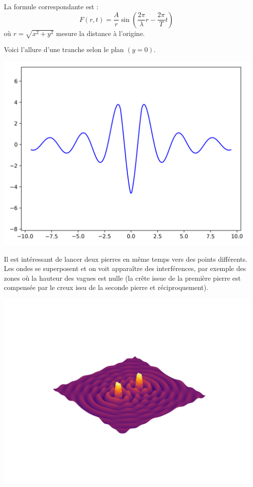 \documentclass[11pt,class=report,crop=false]{standalone}
\begin{document}
La formule correspondante est :
$$F(r,t) = \frac{A}{r} \sin\left(\frac{2\pi}{\lambda} r -  \frac{2\pi}{T} t\right)$$
où $r = \sqrt{x^2+y^2}$ mesure la distance à l'origine.

Voici l'allure d'une tranche selon le plan $(y=0)$.
\begin{center}
	\includegraphics[scale=\myscale,scale=0.4]{figures/ondes2D-1}
\end{center}


Il est intéressant de lancer deux pierres en même temps vers des points différents. 
Les ondes se superposent et on voit apparaître des interférences, par exemple des zones où la hauteur des vagues est nulle (la crête issue de la première pierre est compensée par le creux issu de la seconde pierre et réciproquement).
\begin{center}
	\includegraphics[scale=\myscale,scale=0.8,trim={0 2.5cm 0 3cm},clip]{figures/ondes2D-3}
\end{center}
\end{document}
